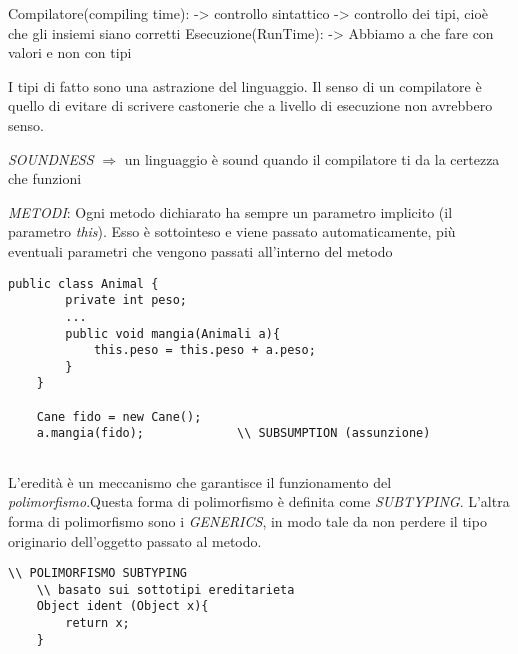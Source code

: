 Compilatore(compiling time): \newline
-> controllo sintattico \newline
-> controllo dei tipi, cioè che gli insiemi siano corretti\newline
\newline
Esecuzione(RunTime):\newline
-> Abbiamo a che fare con valori e non con tipi \newline
\newline

I tipi di fatto sono una astrazione del linguaggio. \newline
Il senso di un compilatore è quello di evitare di scrivere castonerie che a livello di esecuzione non avrebbero senso. \newline

\textit{SOUNDNESS} $\Rightarrow$ un linguaggio è sound quando il compilatore ti da la certezza che funzioni
\newline

\textit{METODI}: Ogni metodo dichiarato ha sempre un parametro implicito (il parametro \textit{this}). Esso è sottointeso e viene passato automaticamente, più eventuali parametri che vengono passati all'interno del metodo
\newline

\begin{lstlisting}[basicstyle=\small,]
	public class Animal {
		private int peso;
		...
		public void mangia(Animali a){
			this.peso = this.peso + a.peso;
		}
	}
	
	Cane fido = new Cane();
	a.mangia(fido); 			\\ SUBSUMPTION (assunzione)	
	
\end{lstlisting}


L'eredità è un meccanismo che garantisce il funzionamento del \textit{polimorfismo}.Questa forma di
polimorfismo è definita come \textit{SUBTYPING}. \newline
L'altra forma di polimorfismo sono i \textit{GENERICS}, in modo tale da non perdere il tipo originario
dell'oggetto passato al metodo. \newline

\begin{lstlisting}[basicstyle=\small,]
	\\ POLIMORFISMO SUBTYPING
	\\ basato sui sottotipi ereditarieta
	Object ident (Object x){
		return x;
	}
\end{lstlisting}


